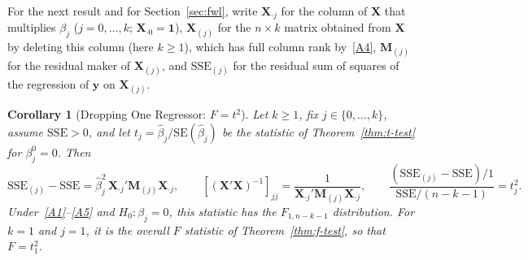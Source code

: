 \documentclass[14pt]{extarticle}
\theoremstyle{plain}
\newtheorem{corollary}[theorem]{Corollary}
\theoremstyle{definition}
\theoremstyle{remark}
\newcommand{\SSE}{\mathrm{SSE}}
\newcommand{\SE}{\mathrm{SE}}
\newcommand{\bX}{\mathbf{X}}
\newcommand{\by}{\mathbf{y}}
\newcommand{\bM}{\mathbf{M}}
\newcommand{\bone}{\mathbf{1}}
\begin{document}
For the next result and for Section~\ref{sec:fwl}, write $\bX_{\cdot j}$ for the column of $\bX$ that multiplies $\beta_j$ ($j = 0, \ldots, k$; $\bX_{\cdot 0} = \bone$), $\bX_{(j)}$ for the $n \times k$ matrix obtained from $\bX$ by deleting this column (here $k \geqslant 1$), which has full column rank by~\ref{A4}, $\bM_{(j)}$ for the residual maker of $\bX_{(j)}$, and $\SSE_{(j)}$ for the residual sum of squares of the regression of $\by$ on $\bX_{(j)}$.

\begin{corollary}[Dropping One Regressor: $F = t^2$]\label{cor:drop-one}
Let $k \geqslant 1$, fix $j \in \{0, \ldots, k\}$, assume $\SSE > 0$, and let $t_j = \hat\beta_j/\SE(\hat\beta_j)$ be the statistic of Theorem~\ref{thm:t-test} for $\beta_j^0 = 0$. Then
\[
\SSE_{(j)} - \SSE = \hat\beta_j^2\,\bX_{\cdot j}'\bM_{(j)}\bX_{\cdot j}, \qquad [(\bX'\bX)^{-1}]_{jj} = \frac{1}{\bX_{\cdot j}'\bM_{(j)}\bX_{\cdot j}}, \qquad \frac{(\SSE_{(j)} - \SSE)/1}{\SSE/(n-k-1)} = t_j^2.
\]
Under~\ref{A1}--\ref{A5} and $H_0\colon \beta_j = 0$, this statistic has the $F_{1,n-k-1}$ distribution. For $k = 1$ and $j = 1$, it is the overall $F$ statistic of Theorem~\ref{thm:f-test}, so that $F = t_1^2$.
\end{corollary}
\end{document}
